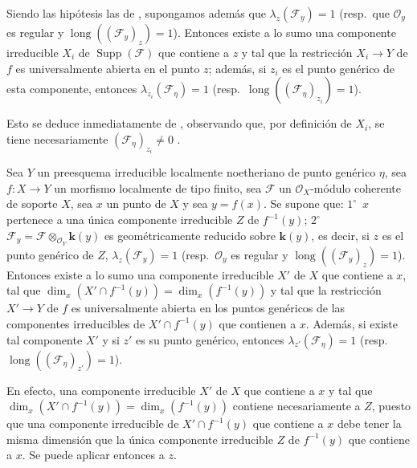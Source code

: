 \begin{corollary}[15.1.2]
\label{IV.15.1.2}
Siendo las hipótesis las de , supongamos además que $\lambda_z(\mathcal F_y)=1$ \textup{(resp.}~que $\mathcal O_y$ es regular y $\operatorname{long}((\mathcal F_y)_z)=1$\textup{)}.
Entonces existe a lo sumo una componente irreducible $X_i$ de $\operatorname{Supp}(\mathcal F)$ que contiene a $z$ y tal que la restricción $X_i\to Y$ de $f$ es universalmente abierta en el punto $z$; además, si $z_i$ es el punto genérico de esta componente, entonces $\lambda_{z_i}(\mathcal F_\eta)=1$ \textup{(resp.~$\operatorname{long}((\mathcal F_\eta)_{z_i})=1$)}.
\end{corollary}

Esto se deduce inmediatamente de , observando que, por definición de $X_i$, se tiene necesariamente $(\mathcal F_\eta)_{z_i}\ne0$ .

\begin{corollary}[15.1.3]
\label{IV.15.1.3}
Sea $Y$ un preesquema irreducible localmente noetheriano de punto genérico $\eta$, sea $f:X\to Y$ un morfismo localmente de tipo finito, sea $\mathcal F$ un $\mathcal O_X$-módulo coherente de soporte $X$, sea $x$ un punto de $X$ y sea $y=f(x)$.
Se supone que: $1^\circ$~$x$ pertenece a una única componente irreducible $Z$ de $f^{-1}(y)$; $2^\circ$~$\mathcal F_y=\mathcal F\otimes_{\mathcal O_Y}\boldsymbol{k}(y)$ es geométricamente reducido sobre $\boldsymbol{k}(y)$, es decir, si $z$ es el punto genérico de $Z$, $\lambda_z(\mathcal F_y)=1$ \textup{(resp.}~$\mathcal O_y$ es regular y $\operatorname{long}((\mathcal F_y)_z)=1$\textup{)}.
Entonces existe a lo sumo una componente irreducible $X'$ de $X$ que contiene a $x$, tal que $\dim_x(X'\cap f^{-1}(y))=\dim_x(f^{-1}(y))$ y tal que la restricción $X'\to Y$ de $f$ es universalmente abierta en los puntos genéricos de las componentes irreducibles de $X'\cap f^{-1}(y)$ que contienen a $x$.
Además, si existe tal componente $X'$ y si $z'$ es su punto genérico, entonces $\lambda_{z'}(\mathcal F_\eta)=1$ \textup{(resp.~$\operatorname{long}((\mathcal F_\eta)_{z'})=1$)}.
\end{corollary}

En efecto, una componente irreducible $X'$ de $X$ que contiene a $x$ y tal que $\dim_x(X'\cap f^{-1}(y))=\dim_x(f^{-1}(y))$ contiene necesariamente a $Z$, puesto que una componente irreducible de $X'\cap f^{-1}(y)$ que contiene a $x$ debe tener la misma dimensión que la única componente irreducible $Z$ de $f^{-1}(y)$ que contiene a $x$.
Se puede aplicar entonces  a $z$.


